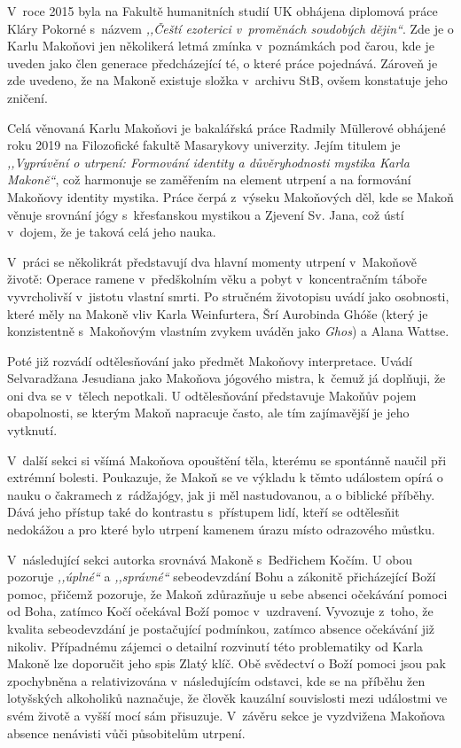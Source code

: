 V~roce 2015 byla na Fakultě humanitních studií UK obhájena diplomová práce Kláry
Pokorné s~názvem \textit{,,Čeští ezoterici v~proměnách soudobých dějin``}. Zde
je o Karlu Makoňovi jen několikerá letmá zmínka v~poznámkách pod čarou, kde je
uveden jako člen generace předcházející té, o které práce pojednává. Zároveň je
zde uvedeno, že na Makoně existuje složka v~archivu StB, ovšem konstatuje jeho
zničení.

Celá věnovaná Karlu Makoňovi je bakalářská práce Radmily Müllerové obhájené roku
2019 na Filozofické fakultě Masarykovy univerzity. Jejím titulem je
\textit{,,Vyprávění o utrpení: Formování identity a důvěryhodnosti mystika Karla
Makoně``}, což harmonuje se zaměřením na element utrpení a na formování Makoňovy
identity mystika. Práce čerpá z~výseku Makoňových děl, kde se Makoň věnuje
srovnání jógy s~křesťanskou mystikou a Zjevení Sv. Jana, což ústí v~dojem, že je
taková celá jeho nauka.

V~práci se několikrát představují dva hlavní momenty utrpení v~Makoňově životě:
Operace ramene v~předškolním věku a pobyt v~koncentračním táboře vyvrcholivší
v~jistotu vlastní smrti. Po stručném životopisu uvádí jako osobnosti, které měly
na Makoně vliv Karla Weinfurtera, Šrí Aurobinda Ghóše (který je konzistentně
s~Makoňovým vlastním zvykem uváděn jako \textit{Ghos}) a Alana Wattse.

Poté již rozvádí odtělesňování jako předmět Makoňovy interpretace. Uvádí
Selvaradžana Jesudiana jako Makoňova jógového mistra, k~čemuž já doplňuji, že
oni dva se v~tělech nepotkali. U odtělesňování představuje Makoňův pojem
obapolnosti, se kterým Makoň napracuje často, ale tím zajímavější je jeho
vytknutí.

V~další sekci si všímá Makoňova opouštění těla, kterému se spontánně
naučil při extrémní bolesti. Poukazuje, že Makoň se ve výkladu k těmto událostem
opírá o nauku o čakramech z~rádžajógy, jak ji měl nastudovanou, a o biblické
příběhy. Dává jeho přístup také do kontrastu s~přístupem lidí, kteří se
odtělesňit nedokážou a pro které bylo utrpení kamenem úrazu místo odrazového
můstku.

V~následující sekci autorka srovnává Makoně s~Bedřichem Kočím. U obou pozoruje
\textit{,,úplné``} a \textit{,,správné``} sebeodevzdání Bohu a zákonitě
přicházející Boží pomoc, přičemž pozoruje, že Makoň zdůrazňuje u sebe absenci
očekávání pomoci od Boha, zatímco Kočí očekával Boží pomoc v~uzdravení. Vyvozuje
z~toho, že kvalita sebeodevzdání je postačující podmínkou, zatímco absence
očekávání již nikoliv. Případnému zájemci o detailní rozvinutí této problematiky
od Karla Makoně lze doporučit jeho spis Zlatý klíč\cite{KMZlatyKlic}. Obě
svědectví o Boží pomoci jsou pak zpochybněna a relativizována v~následujícím
odstavci, kde se na příběhu žen lotyšských alkoholiků naznačuje, že člověk
kauzální souvislosti mezi událostmi ve svém životě a vyšší mocí sám přisuzuje.
V~závěru sekce je vyzdvižena Makoňova absence nenávisti vůči působitelům
utrpení.

